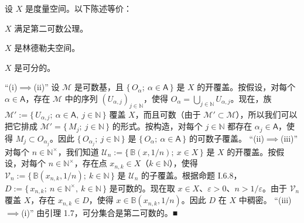 \begin{proposition}

设 $ X $ 是度量空间。以下陈述等价：

\begin{subitems}
\item

$ X $ 满足第二可数公理。

\item

$ X $ 是林德勒夫空间。

\item

$ X $ 是可分的。

\proofhead
“(i)$ \implies $(ii)” 设 $ \mathcal{M} $ 是可数基，且 $ \{\, O_{\alpha} ;\ \alpha \in \mathsf{A} \,\} $ 是 $ X $ 的开覆盖。按假设，对每个 $ \alpha \in \mathsf{A} $，存在 $ \mathcal{M} $ 中的序列 $ (U_{\alpha,j})_{j \in \mathbb{N}} $，使得 $ O_{\alpha} = \bigcup_{j \in \mathbb{N}} U_{\alpha,j} $。现在，族 $ \mathcal{M}' := \{\, U_{\alpha,j} ;\ \alpha \in \mathsf{A},\ j \in \mathbb{N} \,\} $ 覆盖 $ X $，而且可数（由于 $ \mathcal{M}' \subset \mathcal{M} $），所以我们可以把它排成 $ \mathcal{M}' = \{\, M_{j} ;\ j \in \mathbb{N} \,\} $ 的形式。按构造，对每个 $ j \in \mathbb{N} $ 都存在 $ \alpha_{j} \in \mathsf{A} $，使得 $ M_{j} \subset O_{\alpha_{j}} $。因此 $ \{\, O_{\alpha_{j}} ;\ j \in \mathbb{N} \,\} $ 是 $ \{\, O_{\alpha} ;\ \alpha \in \mathsf{A} \,\} $ 的可数子覆盖。
“(ii)$ \implies $(iii)” 对每个 $ n \in \mathbb{N}^{\times} $，我们知道 $ \mathcal{U}_{n} := \{\, \mathbb{B}(x, 1/n) ;\ x \in X \,\} $ 是 $ X $ 的开覆盖。按假设，对每个 $ n \in \mathbb{N}^{\times} $，存在点 $ x_{n,k} \in X $（$ k \in \mathbb{N} $），使得 $ \mathcal{V}_{n} := \{\, \mathbb{B}(x_{n,k}, 1/n) ;\ k \in \mathbb{N} \,\} $ 是 $ \mathcal{U}_{n} $ 的子覆盖。根据命题 I.6.8，$ D := \{\, x_{n,k} ;\ n \in \mathbb{N}^{\times},\ k \in \mathbb{N} \,\} $ 是可数的。现在取 $ x \in X $、$ \varepsilon > 0 $、$ n > 1/\varepsilon $。由于 $ \mathcal{V}_{n} $ 覆盖 $ X $，存在 $ x_{n,k} \in D $，使得 $ x \in \mathbb{B}(x_{n,k}, 1/n) $。因此 $ D $ 在 $ X $ 中稠密。
“(iii)$ \implies $(i)” 由引理 1.7，可分集合是第二可数的。\nobreak\hspace{0.35em}■
\end{subitems}

\end{proposition}

